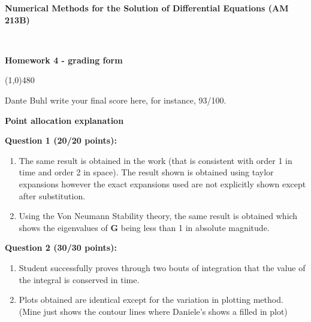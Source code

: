\documentclass[10pt,english]{article}
\def\vss{\vspace{1cm}}
\def\vs{\vspace{0.2cm}}
\begin{document}
\noindent
\centerline{
\textbf{\large Numerical Methods for the Solution of Differential Equations (AM 213B)}}\\
\centerline{{\bf Homework 4 - grading form}}
%
\centerline{\line(1,0){480}}\vspace{.cm}

\vspace{0.2cm}
 Dante Buhl
\vs
{} write your final score here, for instance, 93/100.

\vss\noindent
\centerline{\bf Point allocation explanation}


\vs
{\bf Question 1 (20/20 points):} 
\begin{enumerate}[label=\alph*)]
    \item The same result is obtained in the work (that is consistent with order 1 in time and
    order 2 in space). The result shown is obtained using taylor expansions
    however the exact expansions used are not explicitly shown except after
    substitution. 
    \item Using the Von Neumann Stability theory, the same result is obtained
    which shows the eigenvalues of $\boldsymbol{G}$ being less than 1 in
    absolute magnitude. 

\end{enumerate}

\vs   
{\bf Question 2 (30/30 points):} 
\begin{enumerate}[label=\alph*)]
    \item Student successfully proves through two bouts of integration that the
    value of the integral is conserved in time. 
    \item Plots obtained are identical except for the variation in plotting
    method. (Mine just shows the contour lines where Daniele's shows a filled in
    plot)
\end{enumerate}
\end{document}
